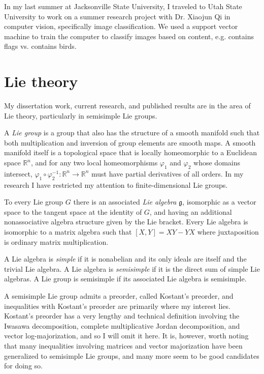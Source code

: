 \documentclass[11pt]{article}
\begin{document}
In my last summer at Jacksonville State University, I traveled to Utah State
University to work on a summer research project with Dr. Xiaojun Qi in computer
vision, specifically image classification. We used a support vector machine to
train the computer to classify images based on content, e.g. contains flags
vs. contains birds.

\section{Lie theory}

My dissertation work, current research, and published results are in the area of
Lie theory, particularly in semisimple Lie groups.

A \emph{Lie group} is a group that also has the structure of a smooth manifold
such that both multiplication and inversion of group elements are smooth maps. A
smooth manifold itself is a topological space that is locally homeomorphic to a
Euclidean space \( \mathbb{R}^n \),
and for any two local homeomorphisms \( \varphi_1 \)
and \( \varphi_2 \)
whose domains intersect,
\( \varphi_1 \circ \varphi_2^{-1}: \mathbb{R}^n \to \mathbb{R}^n \)
must have partial derivatives of all orders. In my research I have restricted my
attention to finite-dimensional Lie groups.

To every Lie group $G$ there is an associated \emph{Lie algebra} \(
\mathfrak{g} \), isomorphic as a vector space to the tangent space at the identity
of $G$, and having an additional nonassociative algebra structure given by the
Lie bracket. Every Lie algebra is isomorphic to a matrix algebra such that \(
[X,Y] = XY - YX \) where juxtaposition is ordinary matrix multiplication. 

A Lie algebra is \emph{simple} if it is nonabelian and its only ideals are
itself and the trivial Lie algebra. A Lie algebra is \emph{semisimple} if it is
the direct sum of simple Lie algebras. A Lie group is semisimple if its
associated Lie algebra is semisimple.

A semisimple Lie group admits a preorder, called Kostant's preorder, and
inequalities with Kostant's preorder are primarily where my interest
lies. Kostant's preorder has a very lengthy and technical definition involving
the Iwasawa decomposition, complete multiplicative Jordan decomposition, and
vector log-majorization, and so I will omit it here. It is, however,
worth noting that many inequalities involving matrices and vector majorization
have been generalized to semisimple Lie groups, and many more seem to be good
candidates for doing so.
\end{document}
